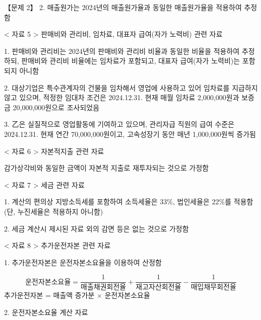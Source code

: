 \begin{longquestion}{【문제 2】}
2. 매출원가는 2024년의 매출원가율과 동일한 매출원가율을 적용하여 추정함 \par
< 자료 5 > 판매비와 관리비, 임차료, 대표자 급여(자가 노력비) 관련 자료 \par
1. 판매비와 관리비는 2024년의 판매비와 관리비 비율과 동일한 비율을 적용하여 추정하되, 판매비와 관리비 비율에는 임차료가 포함되고, 대표자 급여(자가 노력비)는 포함되지 아니함 \par
2. 대상기업은 특수관계자의 건물을 임차해서 영업에 사용하고 있어 임차료를 지급하지 않고 있으며, 적정한 임대차 조건은 2024.12.31. 현재 매월 임차료 2,000,000원과 보증금 20,000,000원으로 조사되었음 \par
3. 乙은 실질적으로 영업활동에 기여하고 있으며, 관리자급 직원의 급여 수준은 2024.12.31. 현재 연간 70,000,000원이고, 고속성장기 동안 매년 1,000,000원씩 증가됨 \par
< 자료 6 > 자본적지출 관련 자료 \par
감가상각비와 동일한 금액이 자본적 지출로 재투자되는 것으로 가정함 \par
< 자료 7 > 세금 관련 자료 \par
1. 계산의 편의상 지방소득세를 포함하여 소득세율은 33\%, 법인세율은 22\%를 적용함 (단, 누진세율은 적용하지 아니함) \par
2. 세금 계산시 제시된 자료 외의 감면 등은 없는 것으로 가정함 \par
< 자료 8 > 추가운전자본 관련 자료 \par
1. 추가운전자본은 운전자본소요율을 이용하여 산정함 \par
\[
\text{운전자본소요율}=\frac{1}{\text{매출채권회전율}}+\frac{1}{\text{재고자산회전율}}-\frac{1}{\text{매입채무회전율}}
\]
추가운전자본 = 매출액 증가분 $\times$ 운전자본소요율 \par
2. 운전자본소요율 계산 자료 \par
{\small\centering
{}\par}


\end{longquestion}
